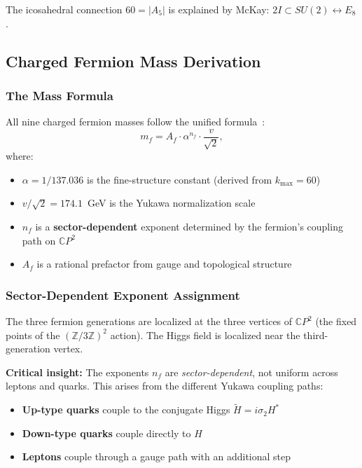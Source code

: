 The icosahedral connection $60 = |A_5|$ is explained by McKay: $2I \subset SU(2) \leftrightarrow E_8$.

\subsection{Charged Fermion Mass Derivation}\label{app:fermion-masses}

\subsubsection{The Mass Formula}

All nine charged fermion masses follow the unified formula~\cite{AlcockFermionMass2026}:
\begin{equation}\label{eq:mass_formula}
m_f = A_f \cdot \alpha^{n_f} \cdot \frac{v}{\sqrt{2}},
\end{equation}
where:
\begin{itemize}
\item $\alpha = 1/137.036$ is the fine-structure constant (derived from $k_{\max} = 60$)
\item $v/\sqrt{2} = 174.1$~GeV is the Yukawa normalization scale
\item $n_f$ is a \textbf{sector-dependent} exponent determined by the fermion's coupling path on $\mathbb{C}P^2$
\item $A_f$ is a rational prefactor from gauge and topological structure
\end{itemize}

\subsubsection{Sector-Dependent Exponent Assignment}

The three fermion generations are localized at the three vertices of 
$\mathbb{C}P^2$ (the fixed points of the $(\mathbb{Z}/3\mathbb{Z})^2$ action). 
The Higgs field is localized near the third-generation vertex.

\textbf{Critical insight:} The exponents $n_f$ are \emph{sector-dependent}, not uniform 
across leptons and quarks. This arises from the different Yukawa coupling paths:
\begin{itemize}
\item \textbf{Up-type quarks} couple to the conjugate Higgs $\tilde{H} = i\sigma_2 H^*$
\item \textbf{Down-type quarks} couple directly to $H$
\item \textbf{Leptons} couple through a gauge path with an additional step
\end{itemize}

